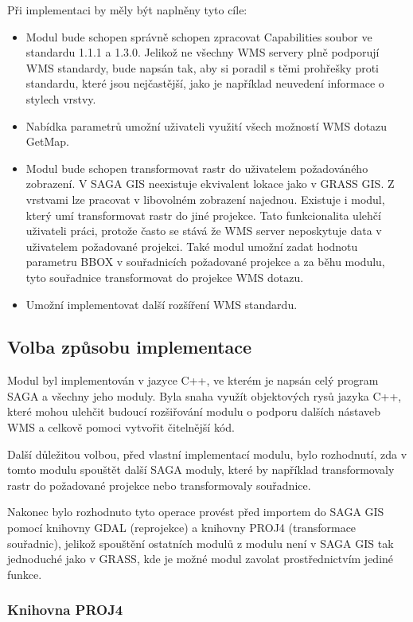 \documentclass[a4paper,12pt]{article}
\begin{document}
Při implementaci by měly být naplněny tyto cíle:
\begin{itemize}
\item  Modul bude schopen správně schopen zpracovat Capabilities soubor ve standardu 1.1.1 a 1.3.0.  Jelikož ne všechny WMS servery plně podporují WMS standardy, bude napsán tak, aby si poradil s těmi prohřešky proti standardu, které jsou nejčastější, jako je například neuvedení informace o stylech vrstvy.  
\item Nabídka parametrů umožní uživateli využití všech možností WMS dotazu GetMap.
\item Modul bude schopen transformovat rastr do uživatelem požadováného zobrazení. V SAGA GIS neexistuje ekvivalent lokace jako v GRASS GIS. Z vrstvami lze pracovat v libovolném zobrazení najednou. Existuje i modul,
      který umí transformovat rastr do jiné projekce. Tato funkcionalita ulehčí uživateli práci, protože často se stává že WMS server neposkytuje data v uživatelem požadované projekci. 
Také modul umožní zadat hodnotu parametru BBOX v souřadnicích požadované projekce a za běhu modulu, tyto souřadnice transformovat do projekce WMS dotazu.
\item Umožní implementovat další rozšíření WMS standardu. 
\end{itemize}


\subsection{Volba způsobu implementace}

Modul byl implementován v jazyce C++, ve kterém je napsán celý program SAGA a všechny jeho moduly.  Byla snaha využít objektových rysů jazyka C++, které mohou ulehčit budoucí rozšiřování 
modulu o podporu dalších nástaveb WMS a celkově pomoci vytvořit čitelnější kód. 

Další důležitou volbou, před vlastní implementací modulu, bylo rozhodnutí, zda v tomto modulu spouštět další SAGA moduly, které  by například transformovaly rastr do požadované projekce nebo transformovaly souřadnice. 

Nakonec bylo rozhodnuto tyto operace provést před importem do SAGA GIS pomocí knihovny GDAL (reprojekce) a knihovny PROJ4 (transformace souřadnic), jelikož spouštění ostatních modulů z modulu není v SAGA GIS tak jednoduché jako v GRASS, kde je možné modul zavolat prostřednictvím jediné funkce. 

\subsubsection{Knihovna PROJ4}
\end{document}
